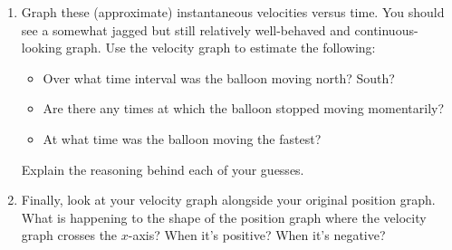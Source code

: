 \begin{enumerate}
	Apply this idea to compute an instantaneous velocity estimate for \textit{every} time in column~\textbf{D}. For example, the entry in the row for time~16 should compute an approximation for the instantaneous velocity at time~16, the entry in the row for time~763 should compute an approximation for the instantaneous velocity at time~763, and so on\footnote{Hint:~Most of the cells can be handled with a single formula copied into every row, but the first and last rows may need to be handled separately, since any average velocity computed for the first time cannot include data from an earlier time, and any average velocity computed for the last time cannot include data from a later time.}.
	
	\item Graph these (approximate) instantaneous velocities versus time. You should see a somewhat jagged but still relatively well-behaved and continuous-looking graph. Use the velocity graph to estimate the following:
	\begin{itemize}
		\item Over what time interval was the balloon moving north? South?
		\item Are there any times at which the balloon stopped moving momentarily?
		\item At what time was the balloon moving the fastest?
	\end{itemize}
	
	Explain the reasoning behind each of your guesses.
	
	\item Finally, look at your velocity graph alongside your original position graph. What is happening to the shape of the position graph where the velocity graph crosses the $x$-axis? When it's positive? When it's negative?
\end{enumerate}
